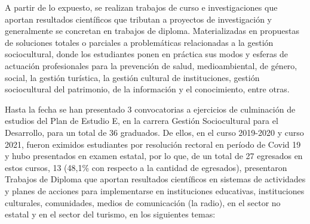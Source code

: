 A partir de lo expuesto, se realizan trabajos de curso e investigaciones que aportan resultados científicos que tributan a proyectos de investigación y generalmente se concretan en trabajos de diploma. Materializadas en propuestas de soluciones totales o parciales a problemáticas relacionadas a la gestión sociocultural, donde los estudiantes ponen en práctica sus modos y esferas de actuación profesionales para la prevención de salud, medioambiental, de género, social, la gestión turística, la gestión cultural de instituciones, gestión sociocultural del patrimonio, de la información y el conocimiento, entre otras.

Hasta la fecha se han presentado 3 convocatorias a ejercicios de culminación de estudios del Plan de Estudio E, en la carrera Gestión Sociocultural para el Desarrollo, para un total de 36 graduados. De ellos, en el curso 2019-2020 y curso 2021, fueron eximidos estudiantes por resolución rectoral en período de Covid 19 y hubo presentados en examen estatal, por lo que, de un total de 27 egresados en estos cursos, 13 (48,1\% con respecto a la cantidad de egresados), presentaron Trabajos de Diploma que aportan resultados científicos en sistemas de actividades y planes de acciones para implementarse en instituciones educativas, instituciones culturales, comunidades, medios de comunicación (la radio), en el sector no estatal y en el sector del turismo, en los siguientes temas: 

